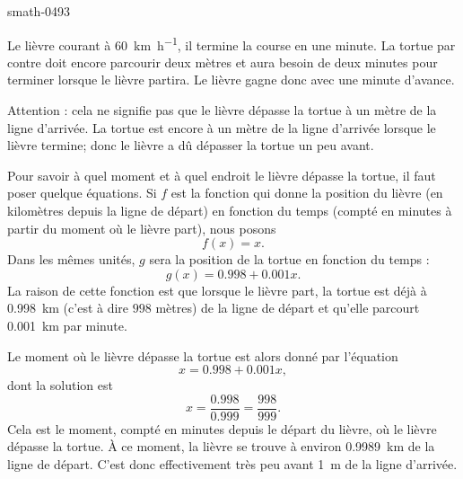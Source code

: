 
\begin{corrige}{smath-0493}

    Le lièvre courant à \SI{60}{\kilo\meter\per\hour}, il termine la course en une minute. La tortue par contre doit encore parcourir deux mètres et aura besoin de deux minutes pour terminer lorsque le lièvre partira. Le lièvre gagne donc avec une minute d'avance.

    Attention : cela ne signifie pas que le lièvre dépasse la tortue à un mètre de la ligne d'arrivée. La tortue est encore à un mètre de la ligne d'arrivée lorsque le lièvre termine; donc le lièvre a dû dépasser la tortue un peu avant.

    Pour savoir à quel moment et à quel endroit le lièvre dépasse la tortue, il faut poser quelque équations. Si \( f\) est la fonction qui donne la position du lièvre (en kilomètres depuis la ligne de départ) en fonction du temps (compté en minutes à partir du moment où le lièvre part), nous posons
    \begin{equation}
        f(x)=x.
    \end{equation}
    Dans les mêmes unités, \( g\) sera la position de la tortue en fonction du temps :
    \begin{equation}
        g(x)=0.998+0.001x.
    \end{equation}
    La raison de cette fonction est que lorsque le lièvre part, la tortue est déjà à \SI{0.998}{\kilo\meter} (c'est à dire \( 998\) mètres) de la ligne de départ et qu'elle parcourt \SI{0.001}{\kilo\meter} par minute.

    Le moment où le lièvre dépasse la tortue est alors donné par l'équation
    \begin{equation}
        x=0.998+0.001x,
    \end{equation}
    dont la solution est
    \begin{equation}
        x=\frac{ 0.998 }{ 0.999 }=\frac{ 998 }{ 999 }.
    \end{equation}
    Cela est le moment, compté en minutes depuis le départ du lièvre, où le lièvre dépasse la tortue. À ce moment, la lièvre se trouve à environ \SI{0.9989}{\kilo\meter} de la ligne de départ. C'est donc effectivement très peu avant \SI{1}{\meter} de la ligne d'arrivée.

\end{corrige}

